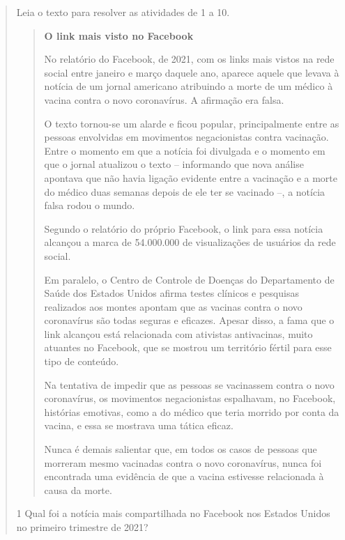 \begin{quote}

Leia o texto para resolver as atividades de 1 a 10.

\begin{quote}
\textbf{O link mais visto no Facebook}

No relatório do Facebook, de 2021, com os links mais vistos na rede social
entre janeiro e março daquele ano, aparece aquele que levava à notícia
de um jornal americano atribuindo a morte de um médico à vacina contra
o novo coronavírus. A afirmação era falsa.

O texto tornou-se um alarde e ficou popular, principalmente entre as pessoas
envolvidas em movimentos negacionistas contra vacinação. Entre o momento em
que a notícia foi divulgada e o momento em que o jornal atualizou o texto --
informando que nova análise apontava que não havia ligação evidente entre a
vacinação e a morte do médico duas semanas depois de ele ter se vacinado --,
a notícia falsa rodou o mundo.

Segundo o relatório do próprio Facebook, o link para essa notícia alcançou
a marca de 54.000.000 de visualizações de usuários da rede social.

Em paralelo, o Centro de Controle de Doenças do Departamento de Saúde dos Estados
Unidos afirma testes clínicos e pesquisas realizados aos montes apontam que as
vacinas contra o novo coronavírus são todas seguras e eficazes. Apesar disso, a
fama que o link alcançou está relacionada com ativistas antivacinas, muito atuantes
no Facebook, que se mostrou um território fértil para esse tipo de conteúdo.

Na tentativa de impedir que as pessoas se vacinassem contra o novo coronavírus,
os movimentos negacionistas espalhavam, no Facebook, histórias emotivas, como
a do médico que teria morrido por conta da vacina, e essa se mostrava uma
tática eficaz.

Nunca é demais salientar que, em todos os casos de pessoas que morreram
mesmo vacinadas contra o novo coronavírus, nunca foi encontrada uma evidência
de que a vacina estivesse relacionada à causa da morte.

\end{quote}


\num{1} Qual foi a notícia mais compartilhada no Facebook nos Estados
Unidos no primeiro trimestre de 2021?


\end{quote}
